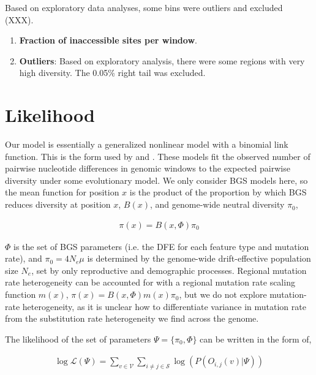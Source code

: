 \documentclass[11pt]{article}
\begin{document}
Based on exploratory data analyses, some bins were outliers and
excluded (XXX).

\begin{enumerate}
  \item \textbf{Fraction of inaccessible sites per window}.  

  \item \textbf{Outliers}: Based on exploratory analysis, there were some
    regions with very high diversity. The 0.05\% right tail was excluded.

\end{enumerate}



\section*{Likelihood}

Our model is essentially a generalized nonlinear model with a binomial link
function. This is the form used by \textcite{Elyashiv2016-vt} and
\textcite{Murphy2022-sj}. These models fit the observed number of pairwise
nucleotide differences in genomic windows to the expected pairwise diversity
under some evolutionary model. We only consider BGS models here, so the mean
function for position $x$ is the product of the proportion by which BGS reduces
diversity at position $x$, $B(x)$, and genome-wide neutral diversity $\pi_0$,

\begin{align}
  \pi(x) = B(x, \Phi) \pi_0
\end{align}

$\Phi$ is the set of BGS parameters (i.e. the DFE for each feature type and
mutation rate), and $\pi_0 = 4 N_e \mu$ is determined by the genome-wide
drift-effective population size $N_e$, set by only reproductive and demographic
processes. Regional mutation rate heterogeneity can be accounted for with a
regional mutation rate scaling function $m(x)$, $\pi(x) = B(x, \Phi) m(x)
\pi_0$, but we do not explore mutation-rate heterogeneity, as it is unclear how
to differentiate variance in mutation rate from the substitution rate
heterogeneity we find across the genome.

The likelihood of the set of parameters $\Psi = \{\pi_0, \Phi\}$ can be written
in the form of, 

\begin{align}
  \log\mathcal{L}(\Psi) = \sum_{v \in \mathcal{V}} \sum_{i \ne j \in \mathcal{S}} \log(P(O_{i,j}(v) | \Psi))
\end{align}
\end{document}
